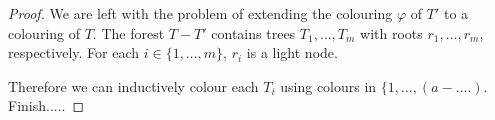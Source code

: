 \documentclass[kpfonts]{patmorin}
\begin{document}
\begin{proof}
    We are left with the problem of extending the colouring $\varphi$ of $T'$ to a colouring of $T$.  The forest $T-T'$ contains trees $T_1,\ldots,T_m$ with roots $r_1,\ldots,r_m$, respectively.  For each $i\in\{1,\ldots,m\}$, $r_i$ is a light node.

    Therefore we can inductively colour each $T_i$ using colours in $\{1,\ldots,(a-....)$.  Finish.....



\end{proof}
\end{document}
